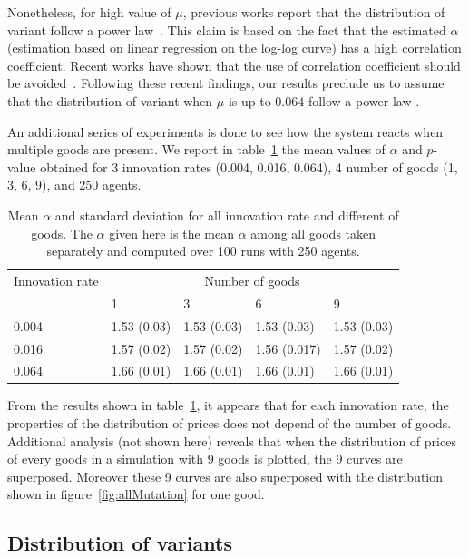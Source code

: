 \documentclass{wscpaperproc}
\newcommand{\memo}[2]{\textcolor{#1}{#2}}
\renewcommand{\memo}[2]{} %
\newcommand{\todo}[1]{\memo{red}{TODO: #1\\}}
\begin{document}
Nonetheless, for high value of $\mu$, previous works report that the distribution of variant follow a power law~\cite{bentley_random_2004}. This claim is based on the fact that the estimated $\alpha$ (estimation based on linear regression on the log-log curve) has a high correlation coefficient. Recent works have shown that the use of correlation coefficient should be avoided~\cite{clauset2009powerlawdistributionsinempiricaldat}. Following these recent findings, our results preclude us to assume that the distribution of variant when $\mu$ is up to $0.064$ follow a power law . 

An additional series of experiments is done to see how the system reacts when multiple goods are present. We report in table~\ref{tab:multiGoods} the mean values of $\alpha$ and $p$-value obtained for 3 innovation rates (0.004, 0.016, 0.064), 4 number of goods (1, 3, 6, 9), and 250 agents. 

\todo{complete table with final result (here it's just false exemple)}
\begin{table}[!h]
	\centering
	\begin{tabular}{l|llll}
		Innovation rate &\multicolumn{4}{c}{Number of goods}\\
		      & 1   & 3   &  6 & 9  \\\hline
		0.004 &1.53 (0.03)  &1.53 (0.03)&1.53 (0.03)&1.53 (0.03) \\
		0.016 &1.57 (0.02)  &1.57 (0.02)&1.56 (0.017)&1.57 (0.02) \\
		0.064 &1.66 (0.01)  &1.66 (0.01)&1.66 (0.01)&1.66 (0.01) \\\hline
	\end{tabular}
	\caption{Mean $\alpha$ and standard deviation for all innovation rate and different  of goods. The $\alpha$ given here is the mean $\alpha$ among all goods taken separately and computed over 100 runs with 250 agents.}
	\label{tab:multiGoods}
\end{table}

From the results shown in table~\ref{tab:multiGoods}, it appears that for each innovation rate, the properties of the distribution of prices does not depend of the number of goods. Additional analysis (not shown here) reveals that when the distribution of prices of every goods in a simulation with 9 goods is plotted, the 9 curves are superposed. Moreover these 9 curves are also superposed with the distribution shown in figure~\ref{fig:allMutation} for one good.


\subsection{Distribution of variants}
\end{document}
